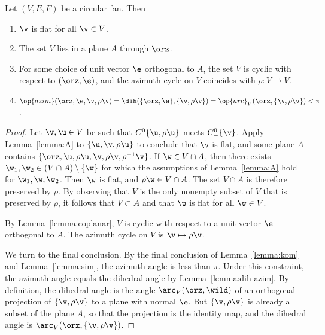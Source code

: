\begin{lemma}
\label{lemma:circular}
Let $(V,E,F)$ be a circular fan. Then
\begin{enumerate}\wasitemize 
\item $\v$ is flat for all $\v\in V$.
\item The set $V$ lies in a plane $A$ through $\orz$.
\item For some choice of unit vector $\e$ orthogonal to $A$, the set
$V$ is cyclic with respect to $(\orz,\e)$, and the azimuth cycle on
$V$ coincides with $\rho:V\to V$.  
\item 
$
\op{azim}(\orz,\e,\v,\rho\v) = \dih(\{\orz,\e\},\{\v,\rho\v\})
=\op{arc}_V(\orz,\{\v,\rho \v\}) <\pi
$.
\end{enumerate}\wasitemize 
\end{lemma}

\begin{proof} Let $\v, \u\in V$ be such that $C^0\{\u,\rho \u\}$ meets
$C^0_-\{\v\}$.  Apply Lemma~\ref{lemma:A} to $\{\u,\v,\rho \u\}$ to
conclude that $\v$ is flat, and some plane $A$ contains
$\{\orz,\u,\rho\u,\v,\rho \v,\rho^{-1} \v\}$.  If
$\w\in V\cap A$, then there exists $\w_1,\w_2\in (V\cap
A)\setminus\{\w\}$ for which the assumptions of Lemma~\ref{lemma:A}
hold for $\w_1,\w,\w_2$.  
Then $\w$ is flat, and $\rho \w \in V\cap A$.  The set $V\cap
A$ is therefore preserved by $\rho$.  By observing that $V$ is the
only nonempty subset of $V$ that is preserved by $\rho$, it follows
that $V\subset A$ and that $\w$ is flat for all $\w\in V$.


By Lemma~\ref{lemma:coplanar}, $V$ is cyclic with respect to a unit
vector $\e$ orthogonal to $A$.  The azimuth cycle on $V$ is $\v
\mapsto \rho \v$.

We turn to the final conclusion.  By the final conclusion of
Lemma~\ref{lemma:kom} and Lemma~\ref{lemma:sim}, the azimuth angle is
less than $\pi$.  Under this constraint, the azimuth angle equals the
dihedral angle by Lemma~\ref{lemma:dih-azim}.  By definition, the
dihedral angle is the angle $\arc_V(\orz,\wild )$ of an orthogonal
projection of $\{\v,\rho\v\}$ to a plane with normal $\e$.  But
$\{\v,\rho\v\}$ is already a subset of the plane $A$, so that the
projection is the identity map, and the dihedral angle is
$\arc_V(\orz,\{\v,\rho\v\})$.
%
\end{proof}

